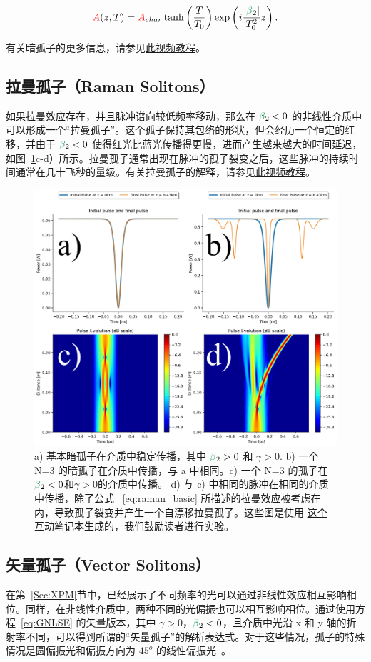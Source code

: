 \begin{align}
    \A(z,T) = \A_{char}\tanh\left(\frac{T}{T_0}\right)\exp\left(i\frac{|\betag_2|}{T_0^2}z \right).
\end{align}

有关暗孤子的更多信息，请参见\href{https://youtu.be/MrNfI1_eTZ0}{此视频教程}。

\subsection{拉曼孤子（Raman Solitons）}
如果拉曼效应存在，并且脉冲谱向较低频率移动，那么在 $\betag_2<0$ 的非线性介质中可以形成一个“拉曼孤子”。这个孤子保持其包络的形状，但会经历一个恒定的红移，并由于 $\betag_2<0$ 使得红光比蓝光传播得更慢，进而产生越来越大的时间延迟，如图~\ref{fig:dark_and_raman}c-d）所示。拉曼孤子通常出现在脉冲的孤子裂变之后，这些脉冲的持续时间通常在几十飞秒的量级。有关拉曼孤子的解释，请参见\href{https://www.youtube.com/watch?v=K33YUfegL1w}{此视频教程}。

\begin{figure}
    \centering
    \includegraphics[width=1\linewidth]{figures/dark_and_raman_soliton_combined.png}
    \caption{a) 基本暗孤子在介质中稳定传播，其中 $\betag_2>0$ 和 $\gamma>0$. b) 一个 N=3 的暗孤子在介质中传播，与 a 中相同。c) 一个 N=3 的孤子在$\betag_2<0$和$\gamma>0$的介质中传播。 d) 与 c) 中相同的脉冲在相同的介质中传播，除了公式 ~\ref{eq:raman_basic} 所描述的拉曼效应被考虑在内，导致孤子裂变并产生一个自漂移拉曼孤子。这些图是使用 \href{https://colab.research.google.com/drive/1qtMcXElXn4VBntfCgXIGGkyDfiGicElx?usp=sharing}{这个互动笔记本}生成的，我们鼓励读者进行实验。}
    \label{fig:dark_and_raman}
\end{figure}

\subsection{矢量孤子（Vector Solitons）}
在第~\ref{Sec:XPM}节中，已经展示了不同频率的光可以通过非线性效应相互影响相位。同样，在非线性介质中，两种不同的光偏振也可以相互影响相位。通过使用方程~\ref{eq:GNLSE} 的矢量版本，其中 $\gamma>0$，$\betag_2<0$，且介质中光沿 x 和 y 轴的折射率不同，可以得到所谓的“矢量孤子”的解析表达式。对于这些情况，孤子的特殊情况是圆偏振光和偏振方向为 $45^{o}$ 的线性偏振光~\cite{AGRAWAL_CH6_POL}。






